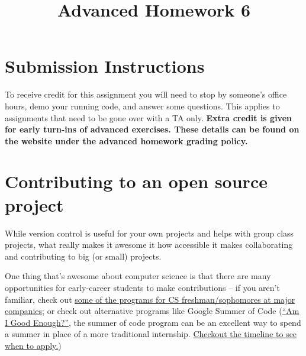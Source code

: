 \documentclass{article}
\begin{document}
\fancyfoot[C]{\color{gray} \thepage~/~\pageref*{LastPage}}
\pagestyle{fancyplain}

\title{\textbf{Advanced Homework 6\\}}
\author{\textbf{\color{red}{Due: Wednesday, October 24th, 11:59PM (Hard Deadline)}}}
\date{}
\maketitle


\section*{Submission Instructions}
To receive credit for this assignment you will need to stop by someone's
office hours, demo your running code, and answer some questions. \textbf{\color{red}{Make sure
to check the office hour schedule as the real due date is at the last office
hours before the date listed above.}} This applies to assignments that need to be gone over with a TA only.
\textbf{Extra credit is given for early turn-ins of advanced exercises. These details can be found on the website under the advanced homework grading policy.}


\section*{Contributing to an open source project}

While version control is useful for your own projects and helps with group
class projects, what really makes it awesome it how accessible it makes
collaborating and contributing to big (or small) projects.

One thing that's awesome about computer science is that there are many
opportunities for early-career students to make contributions -- if you aren't
familiar, check out
\href{https://www.quora.com/What-companies-have-internship-programs-specifically-for-college-freshmen-and-sophomores}{some
  of the programs for CS freshman/sophomores at major companies}; or check out
alternative programs like Google Summer of Code
(\href{http://write.flossmanuals.net/gsocstudentguide/am-i-good-enough/}
{``Am I Good Enough?''}, the summer of code program can be an excellent way to
spend a summer in place of a more traditional internship.
\href{https://developers.google.com/open-source/gsoc/timeline}
  {Checkout the timeline to see when to apply.})
\end{document}
